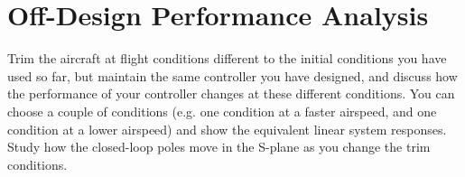 \section{Off-Design Performance Analysis}

Trim the aircraft at flight conditions different to the initial conditions you have used so far, but maintain the same controller you have designed, and discuss how the performance of your controller changes at these different conditions. You can choose a couple of conditions (e.g. one condition at a faster airspeed, and one condition at a lower airspeed) and show the equivalent linear system responses. Study how the closed-loop poles move in the S-plane as you change the trim conditions.